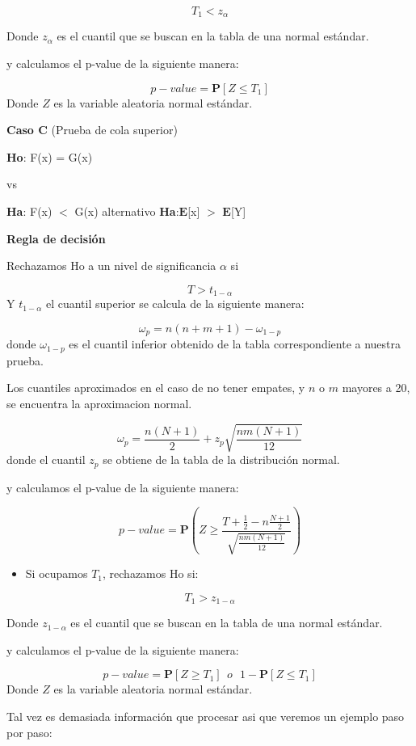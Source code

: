 \documentclass[a4paper,oneside,openany]{book}
\providecommand{\tightlist}{%
  \setlength{\itemsep}{0pt}\setlength{\parskip}{0pt}}
\begin{document}
\[T_{1} < z_{\alpha}\]

Donde \(z_{\alpha}\) es el cuantil que se buscan en la tabla de una
normal estándar.

y calculamos el p-value de la siguiente manera:

\[p-value=\mathbf{P}[Z\leq T_{1}]\] Donde \(Z\) es la variable aleatoria
normal estándar.

\textbf{Caso C} (Prueba de cola superior)

\textbf{Ho}: F(x) = G(x)

vs

\textbf{Ha}: F(x) \(<\) G(x) alternativo
\textbf{Ha}:\(\mathbf{E}\){[}x{]} \(>\) \(\mathbf{E}\){[}Y{]}

\textbf{Regla de decisión}

Rechazamos Ho a un nivel de significancia \(\alpha\) si

\[T > t_{1-{\alpha}}\] Y \(t_{1-\alpha}\) el cuantil superior se calcula
de la siguiente manera:

\[\omega_p= n(n+m+1)-\omega_{1-p}\] donde \(\omega_{1-p}\) es el cuantil
inferior obtenido de la tabla correspondiente a nuestra prueba.

Los cuantiles aproximados en el caso de no tener empates, y \(n\) o
\(m\) mayores a 20, se encuentra la aproximacion normal.

\[ \omega_p= \frac{n(N+1)}{2} + z_p\sqrt{\frac{n m(N+1)}{12}}\] donde el
cuantil \(z_p\) se obtiene de la tabla de la distribución normal.

y calculamos el p-value de la siguiente manera:

\[p-value = \mathbf{P}\left(Z\geq\frac{T+\frac{1}{2}-n\frac{N+1}{2}}{\sqrt{\frac{nm(N+1)}{12}}}\right)\]

\begin{itemize}
\tightlist
\item
  Si ocupamos \(T_{1}\), rechazamos Ho si:
\end{itemize}

\[T_{1} > z_{1-\alpha}\]

Donde \(z_{1-\alpha}\) es el cuantil que se buscan en la tabla de una
normal estándar.

y calculamos el p-value de la siguiente manera:

\[p-value=\mathbf{P}[Z\geq T_{1}] \ \ o \ \  \ 1-\mathbf{P}[Z\leq T_{1}]\]
Donde \(Z\) es la variable aleatoria normal estándar.

Tal vez es demasiada información que procesar asi que veremos un ejemplo
paso por paso:
\end{document}
